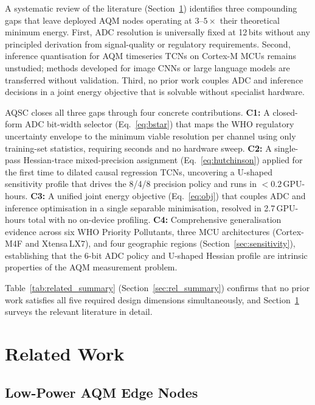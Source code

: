 \documentclass[12pt,a4paper]{article}
\begin{document}
A systematic review of the literature (Section~\ref{sec:related})
identifies three compounding gaps that leave deployed AQM nodes
operating at $3$--$5\times$ their theoretical minimum energy.
First, ADC resolution is universally fixed at 12\,bits without any
principled derivation from signal-quality or regulatory requirements.
Second, inference quantisation for AQM timeseries TCNs on Cortex-M
MCUs remains unstudied; methods developed for image CNNs or large
language models are transferred without validation.
Third, no prior work couples ADC and inference decisions in a joint
energy objective that is solvable without specialist hardware.

AQSC closes all three gaps through four concrete contributions.
\textbf{C1:} A closed-form ADC bit-width selector
(Eq.~\eqref{eq:bstar}) that maps the WHO regulatory uncertainty
envelope to the minimum viable resolution per channel using only
training-set statistics, requiring seconds and no hardware sweep.
\textbf{C2:} A single-pass Hessian-trace mixed-precision assignment
(Eq.~\eqref{eq:hutchinson}) applied for the first time to dilated
causal regression TCNs, uncovering a U-shaped sensitivity profile
that drives the 8/4/8 precision policy and runs in $<0.2$\,GPU-hours.
\textbf{C3:} A unified joint energy objective (Eq.~\eqref{eq:obj})
that couples ADC and inference optimisation in a single separable
minimisation, resolved in 2.7\,GPU-hours total with no on-device
profiling.
\textbf{C4:} Comprehensive generalisation evidence across six WHO
Priority Pollutants, three MCU architectures (Cortex-M4F and
Xtensa\,LX7), and four geographic regions
(Section~\ref{sec:sensitivity}), establishing that the 6-bit ADC
policy and U-shaped Hessian profile are intrinsic properties of the
AQM measurement problem.

Table~\ref{tab:related_summary} (Section~\ref{sec:rel_summary})
confirms that no prior work satisfies all five required design
dimensions simultaneously, and Section~\ref{sec:related} surveys
the relevant literature in detail.

\section{Related Work}
\label{sec:related}

\subsection{Low-Power AQM Edge Nodes}
\label{sec:rel_aqm}
\end{document}
